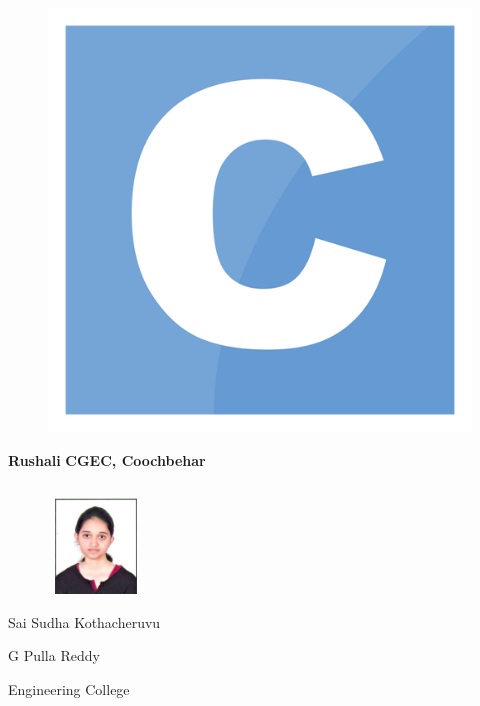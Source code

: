 \documentclass[14pt]{beamer}
\begin{document}
\begin{frame}
			\begin{minipage}[width=0.3\textwidth]         
				\begin{figure}
				\includegraphics[width=\textwidth]{./Codiac/logos/c.png}
				\end{figure}
			\textbf{Rushali} 
			\textbf{CGEC, Coochbehar}                               
		\end{minipage}                                 
\end{frame}

	
        \begin{column}{0.2\textwidth}
            \begin{figure}[htbp]
            \centerline{\includegraphics[width=1in, height=1in]{./Codiac/logos/sudha.jpeg}}
            \end{figure}
             \begin{spacing}{0.5}
                \centerline {\tiny Sai Sudha Kothacheruvu}
                 \centerline {\tiny G Pulla Reddy}
                  \centerline {\tiny Engineering College}
                  \end{spacing}
        \end{column}
        
\end{document}
